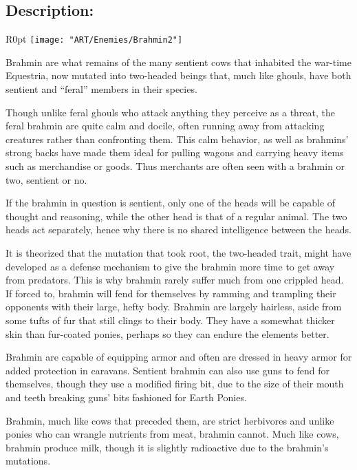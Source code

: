 \documentclass[11pt,a4paper,twocolumn]{book}
\begin{document}
	\subsection*{Description:}
	
	\begin{wrapfigure}{R}{0pt}
		\texttt{[image: "ART/Enemies/Brahmin2"]}
	\end{wrapfigure}
	
	Brahmin are what remains of the many sentient cows that inhabited the war-time Equestria, now mutated into two-headed beings that, much like ghouls, have both sentient and ``feral'' members in their species. 
	
	Though unlike feral ghouls who attack anything they perceive as a threat, the feral brahmin are quite calm and docile, often running away from attacking creatures rather than confronting them.
	This calm behavior, as well as brahmins' strong backs have made them ideal for pulling wagons and carrying heavy items such as merchandise or goods. Thus merchants are often seen with a brahmin or two, sentient or no. 
	
	If the brahmin in question is sentient, only one of the heads will be capable of thought and reasoning, while the other head is that of a regular animal. The two heads act separately, hence why there is no shared intelligence between the heads. 
	
	\bigskip
	It is theorized that the mutation that took root, the two-headed trait, might have developed as a defense mechanism to give the brahmin more time to get away from predators. This is why brahmin rarely suffer much from one crippled head. If forced to, brahmin will fend for themselves by ramming and trampling their opponents with their large, hefty body.
	Brahmin are largely hairless, aside from some tufts of fur that still clings to their body. They have a somewhat thicker skin than fur-coated ponies, perhaps so they can endure the elements better.
	
	Brahmin are capable of equipping armor and often are dressed in heavy armor for added protection in caravans. Sentient brahmin can also use guns to fend for themselves, though they use a modified firing bit, due to the size of their mouth and teeth breaking guns' bits fashioned for Earth Ponies.
	
	\bigskip
	Brahmin, much like cows that preceded them, are strict herbivores and unlike ponies who can wrangle nutrients from meat, brahmin cannot. Much like cows, brahmin produce milk, though it is slightly radioactive due to the brahmin's mutations.
	
\end{document}
